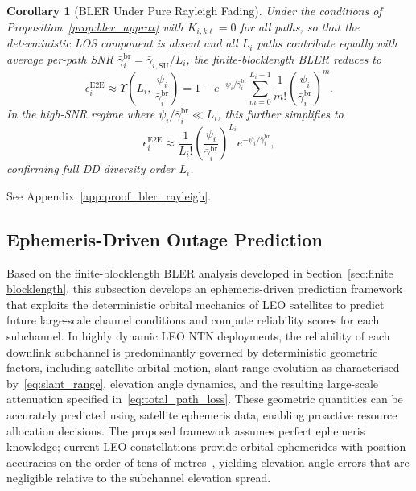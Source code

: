 \documentclass[journal]{IEEEtran}
\newtheorem{corollary}{Corollary}
\begin{document}
\begin{corollary}[BLER Under Pure Rayleigh Fading]
\label{cor:bler_rayleigh}
Under the conditions of Proposition~\ref{prop:bler_approx} with 
$K_{i,k\ell} = 0$ for all paths, so that the deterministic LOS component 
is absent and all $L_i$ paths contribute equally with average per-path SNR 
$\bar{\gamma}_{i}^{\mathrm{br}} = \bar{\gamma}_{i,\mathrm{SU}}/L_i$, the 
finite-blocklength BLER reduces to
\begin{equation}
\epsilon_i^{\mathrm{E2E}} \approx \Upsilon\!\left(L_i,\, 
\frac{\psi_i}{\bar{\gamma}_{i}^{\mathrm{br}}}\right) 
= 1 - e^{-\psi_i/\bar{\gamma}_{i}^{\mathrm{br}}} 
\sum_{m=0}^{L_i-1} \frac{1}{m!}
\left(\frac{\psi_i}{\bar{\gamma}_{i}^{\mathrm{br}}}\right)^{\!m}.
\label{eq:bler_rayleigh}
\end{equation}
In the high-SNR regime where 
$\psi_i/\bar{\gamma}_{i}^{\mathrm{br}} \ll L_i$, 
this further simplifies to
\begin{equation}
\epsilon_i^{\mathrm{E2E}} \approx \frac{1}{L_i!} 
\left(\frac{\psi_i}{\bar{\gamma}_{i}^{\mathrm{br}}}\right)^{\!L_i} 
e^{-\psi_i/\bar{\gamma}_{i}^{\mathrm{br}}},
\label{eq:bler_rayleigh_high_snr}
\end{equation}
confirming full DD diversity order $L_i$.
\end{corollary}

\begin{IEEEproof}
See Appendix~\ref{app:proof_bler_rayleigh}.
\end{IEEEproof}
\subsection{Ephemeris-Driven Outage Prediction}
\label{sec:ephemeris_prediction}

Based on the finite-blocklength BLER analysis developed in Section~\ref{sec:finite blocklength}, this subsection develops an ephemeris-driven prediction framework that exploits the deterministic orbital mechanics of LEO satellites to predict future large‑scale channel conditions and compute reliability scores for each subchannel. In highly dynamic LEO NTN deployments, the reliability of each downlink subchannel is predominantly governed by deterministic geometric factors, including satellite orbital motion, slant-range evolution as characterised by~\eqref{eq:slant_range}, elevation angle dynamics, and the resulting large-scale attenuation specified in~\eqref{eq:total_path_loss}. These geometric quantities can be accurately predicted using satellite ephemeris data, enabling proactive resource allocation decisions. The proposed framework assumes perfect ephemeris knowledge; current LEO constellations 
provide orbital ephemerides with position accuracies on the order of tens of metres~\cite{3GPP38821,3GPP_TR38811,10902219,montenbruck2008precision}, yielding elevation-angle errors that are negligible relative to the subchannel elevation spread.
\end{document}
